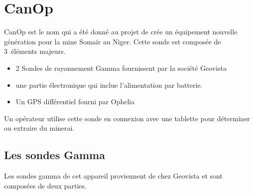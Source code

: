 \section{CanOp}
\label{sec_CanOp}
CanOp est le nom qui a été donné au projet de crée un équipement nouvelle génération pour la mine Somaïr au Niger. Cette sonde est composée de 3~éléments majeurs.
\begin{itemize}
    \item 2 Sondes de rayonnement Gamma fournissent par la société Geovista
    \item une partie électronique qui inclue l'alimentation par batterie. %
    \item Un GPS différentiel fourni par Ophelia
\end{itemize}
Un opérateur utilise cette sonde en connexion avec une tablette pour déterminer ou extraire du minerai.%
\subsection{Les sondes Gamma}
\label{ssec_sonde}



Les sondes gamma de cet appareil proviennent de chez Geovista et sont composées de deux parties.

